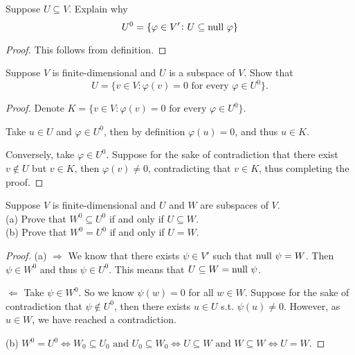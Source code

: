 \documentclass{extarticle}
\begin{document}
\begin{problem}{19}
    Suppose \(U \subseteq V\). Explain why 
    \[U^0 = \{\varphi \in V' \colon U \subseteq \text{null } \varphi\}\]
\end{problem}

\begin{proof}
This follows from definition. 
\end{proof}

\begin{problem}{20}
    Suppose \(V\) is finite-dimensional and \(U\) is a subspace of \(V\). Show that 
    \[U = \{v \in V \colon \varphi(v) = 0 \text{ for every } \varphi \in U^0\}.\]
\end{problem}

\begin{proof}
    Denote \(K = \{v \in V \colon \varphi(v) = 0 \text{ for every } \varphi \in U^0\}\).

Take \(u \in U\) and \(\varphi \in U^0\), then by definition \(\varphi(u) = 0\), and thus 
\(u \in K\). 

Conversely, take \(\varphi \in U^0\). Suppose for the sake of contradiction 
that there exist \(v \notin U\) but \(v \in K\), then \(\varphi(v) \neq 0\), contradicting that 
\(v \in K\), thus completing the proof. 
\end{proof}

\begin{problem}{21}
    Suppose \(V\) is finite-dimensional and \(U\) and \(W\) are subspaces of \(V\). \\ 
    (a) Prove that \(W^0 \subseteq U^0\) if and only if \(U \subseteq W\). \\ 
    (b) Prove that \(W^0 = U^0\) if and only if \(U = W\).  
\end{problem}

\begin{proof}
(a) \(\Rightarrow\) We know that there exists \(\psi \in V'\) such that \(\text{null } \psi = W\). Then 
\(\psi \in W^0\) and thus \(\psi \in U^0\). This means that \(U \subseteq W = \text{null } \psi \).

\(\Leftarrow\) Take \(\psi \in W^0\). So we know \(\psi(w) = 0\) for all \(w \in W\). Suppose 
for the sake of contradiction that \(\psi \notin U^0\), then there exists \(u \in U\) s.t. 
\(\psi(u) \neq 0\). However, as \(u \in W\), we have reached a contradiction. 

(b) \(W^0 = U^0 \Longleftrightarrow W_0 \subseteq U_0 \text{ and } U_0 \subseteq W_0 
\Longleftrightarrow U \subseteq W \text{ and } W \subseteq W \Longleftrightarrow U = W\).
\end{proof}
\end{document}
